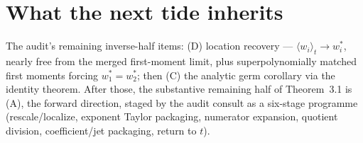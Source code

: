 \documentclass[11pt]{article}
\begin{document}
\section{What the next tide inherits}

The audit's remaining inverse-half items: (D) location recovery ---
$\langle w_i \rangle_t \to w_i^*$, nearly free from the merged
first-moment limit, plus superpolynomially matched first moments
forcing $w_1^* = w_2^*$; then (C) the analytic germ corollary via
the identity theorem. After those, the substantive remaining half of
Theorem~3.1 is (A), the forward direction, staged by the audit
consult as a six-stage programme (rescale/localize, exponent Taylor
packaging, numerator expansion, quotient division, coefficient/jet
packaging, return to $t$).
\end{document}
